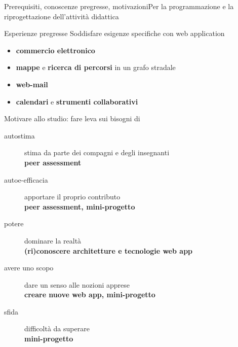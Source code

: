 \documentclass[italian]{beamer}
\begin{document}
\begin{frame}[allowframebreaks]{Prerequisiti, conoscenze pregresse, motivazioni}{Per la programmazione e la riprogettazione dell'attivit\`a didattica}
\begin{block}{Esperienze pregresse}
		Soddisfare esigenze specifiche con web application
		\begin{itemize}
			\item \textbf{commercio elettronico}
			\item \textbf{mappe} e \textbf{ricerca di percorsi} in un grafo stradale
			\item \textbf{web-mail}
			\item \textbf{calendari} e \textbf{strumenti collaborativi}
		\end{itemize}
	\end{block}
		
	\begin{block}{Motivare allo studio: fare leva sui bisogni di}
		\begin{description}
			\item[autostima] stima da parte dei compagni e degli insegnanti\\\hfill\textbf{peer assessment}
			\item[autoe-efficacia] apportare il proprio contributo\\\hfill\textbf{peer assessment, mini-progetto}
			\item[potere] dominare la realt\`a\\\hfill\textbf{(ri)conoscere architetture e tecnologie web app}
			\item[avere uno scopo] dare un senso alle nozioni apprese\\\hfill\textbf{creare nuove web app, mini-progetto}
			\item[sfida] difficolt\`a da superare\\\hfill\textbf{mini-progetto}
		\end{description}
	\end{block}
\end{frame}
\end{document}
